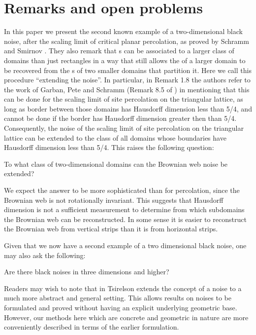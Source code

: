 {
\section{Remarks and open problems}

\label{sec:open-problems}

In this paper we present the second known example of a two-dimensional
black noise, after the scaling limit of critical planar percolation,
as proved by Schramm and Smirnov \cite{schramm-smirnov}.  They also remark
that \sigfield{}s can be associated to a larger class of domains than
just rectangles in a way that still allows the \sigfield{} of a larger
domain to be recovered from the \sigfield{}s of two smaller domains
that partition it.
Here we call this procedure ``extending the noise''.
In particular, in Remark 1.8 the authors refer to the work of Garban,
Pete and Schramm (Remark 8.5 of \cite{garban-pete-schramm}) in
mentioning that this can be done for the
scaling limit of site percolation on the triangular lattice, as long
as border between those domains has Hausdorff dimension less
than 5/4, and cannot be done if the border has Hausdorff dimension
greater then than 5/4.
Consequently, the noise of the scaling limit of site percolation on
the triangular lattice can be extended to the class of all domains
whose boundaries have Hausdorff dimension less than 5/4.
This raises the following question:

\begin{openproblem}
  \label{openproblem:extend}
  To what class of two-dimensional domains can the Brownian web noise be extended?
\end{openproblem}

We expect the answer to be more sophisticated than for percolation,
since the Brownian web is not rotationally invariant.  
This suggests that Hausdorff dimension is not a sufficient measurement
to determine from which subdomains the Brownian web can be
reconstructed.  In some sense it is easier to reconstruct the Brownian
web from vertical strips than it is from horizontal strips.

Given that we now have a second example of a two dimensional black
noise, one may also ask the following:

\begin{openproblem}
  Are there black noises in three dimensions and higher?
\end{openproblem}

Readers may wish to note that in
\cite{tsirelson-noise-as-a-boolean-algebra} Tsirelson extends the
concept of a noise to a much more abstract and general setting.  This
allows results on noises to be formulated and proved without having an
explicit underlying geometric base.  However, our methods here which are
concrete and geometric in nature are more conveniently described in terms
of the earlier formulation.
}

